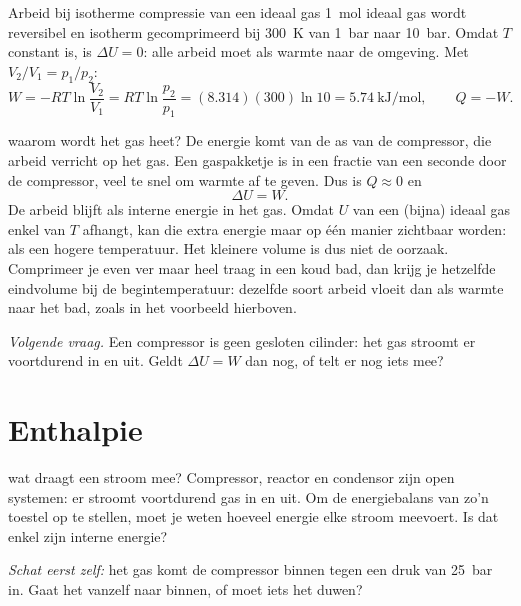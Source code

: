 \begin{voorbeeld}{Arbeid bij isotherme compressie van een ideaal gas}
\SI{1}{\mole} ideaal gas wordt reversibel en isotherm gecomprimeerd bij \SI{300}{\kelvin} van \SI{1}{\bar} naar \SI{10}{\bar}. Omdat $T$ constant is, is $\Delta U = 0$: alle arbeid moet als warmte naar de omgeving. Met $V_2/V_1 = p_1/p_2$:
\[
W = -RT\ln\frac{V_2}{V_1} = RT\ln\frac{p_2}{p_1} = (8.314)(300)\ln 10 = \SI{5.74}{\kilo\joule\per\mole}, \qquad Q = -W.
\]
\end{voorbeeld}

\begin{casusuitgewerkt}{waarom wordt het gas heet?}
De energie komt van de as van de compressor, die arbeid verricht op het gas. Een gaspakketje is in een fractie van een seconde door de compressor, veel te snel om warmte af te geven. Dus is $Q \approx 0$ en
\[
\Delta U = W.
\]
De arbeid blijft als interne energie in het gas. Omdat $U$ van een (bijna) ideaal gas enkel van $T$ afhangt, kan die extra energie maar op \'e\'en manier zichtbaar worden: als een hogere temperatuur. Het kleinere volume is dus niet de oorzaak. Comprimeer je even ver maar heel traag in een koud bad, dan krijg je hetzelfde eindvolume bij de begintemperatuur: dezelfde soort arbeid vloeit dan als warmte naar het bad, zoals in het voorbeeld hierboven.

\emph{Volgende vraag.} Een compressor is geen gesloten cilinder: het gas stroomt er voortdurend in en uit. Geldt $\Delta U = W$ dan nog, of telt er nog iets mee?
\end{casusuitgewerkt}

\section{Enthalpie}
\label{sec:enthalpie}

\begin{casus}{wat draagt een stroom mee?}
Compressor, reactor en condensor zijn open systemen: er stroomt voortdurend gas in en uit. Om de energiebalans van zo'n toestel op te stellen, moet je weten hoeveel energie elke stroom meevoert. Is dat enkel zijn interne energie?

\emph{Schat eerst zelf:} het gas komt de compressor binnen tegen een druk van \SI{25}{\bar} in. Gaat het vanzelf naar binnen, of moet iets het duwen?
\end{casus}

